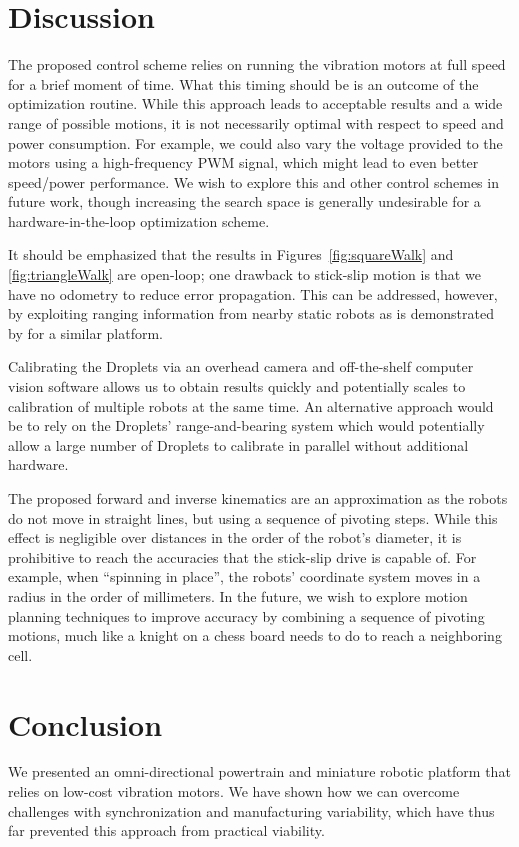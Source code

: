 \documentclass[letterpaper, 10pt, conference]{ieeeconf}
\begin{document}
\section{Discussion}
The proposed control scheme relies on running the vibration motors at full speed for a brief moment of time. What this timing should be is an outcome of the optimization routine. While this approach leads to acceptable results and a wide range of possible motions, it is not necessarily optimal with respect to speed and power consumption. For example, we could also vary the voltage provided to the motors using a high-frequency PWM signal, which might lead to even better speed/power performance. We wish to explore this and other control schemes in future work, though increasing the search space is generally undesirable for a hardware-in-the-loop optimization scheme.  

It should be emphasized that the results in Figures~\ref{fig:squareWalk} and \ref{fig:triangleWalk} are open-loop; one drawback to stick-slip motion is that we have no odometry to reduce error propagation. This can be addressed, however, by exploiting ranging information from nearby static robots as is demonstrated by \cite{rubenstein2012kilobot} for a similar platform.

Calibrating the Droplets via an overhead camera and off-the-shelf computer vision software allows us to obtain results quickly and potentially scales to calibration of multiple robots at the same time. An alternative approach would be to rely on the Droplets' range-and-bearing system \cite{farrow14} which would potentially allow a large number of Droplets to calibrate in parallel without additional hardware. 

The proposed forward and inverse kinematics are an approximation as the robots do not move in straight lines, but using a sequence of pivoting steps. While this effect is negligible over distances in the order of the robot's diameter, it is prohibitive to reach the accuracies that the stick-slip drive is capable of. For example, when ``spinning in place'', the robots' coordinate system moves in a radius in the order of millimeters. In the future, we wish to explore motion planning techniques to improve accuracy by combining a sequence of pivoting motions, much like a knight on a chess board needs to do to reach a neighboring cell. 

\section{Conclusion}
We presented an omni-directional powertrain and miniature robotic platform that relies on low-cost vibration motors. We have shown how we can overcome challenges with synchronization and manufacturing variability, which have thus far prevented this approach from practical viability. 
\end{document}
